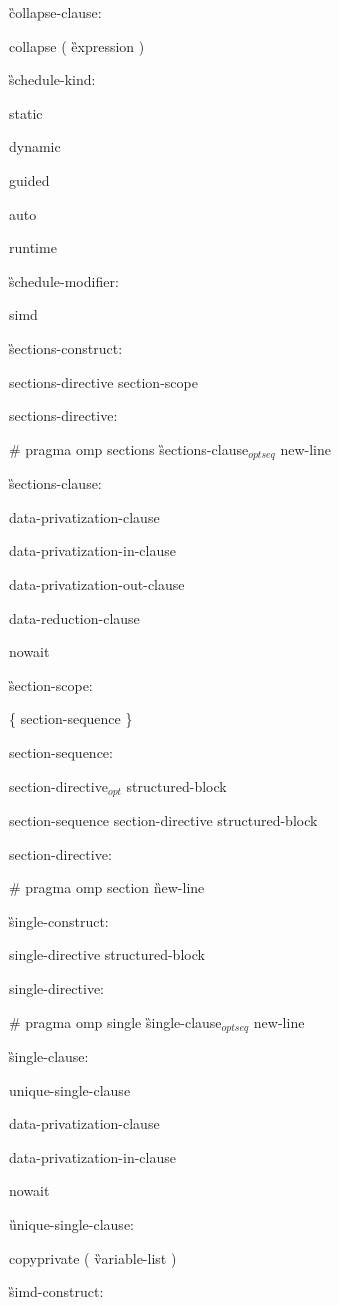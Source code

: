 {\G collapse-clause:

\C\I collapse ( \G expression \C )

\G schedule-kind:

\C\I static

\I dynamic

\I guided

\I auto

\I runtime

\G schedule-modifier:

\C\I simd

\G sections-construct:

\I sections-directive section-scope

sections-directive:

\C\I \# pragma omp sections \G sections-clause$_{optseq}$ new-line

\G sections-clause:

\I data-privatization-clause 

\I data-privatization-in-clause 

\I data-privatization-out-clause 

\I data-reduction-clause 

\C\I nowait

\G section-scope:

\I \{ section-sequence \}

section-sequence:

\I section-directive$_{opt}$ structured-block

\I section-sequence section-directive structured-block

section-directive:

\C\I \# pragma omp section \G new-line

\G single-construct:

\I single-directive structured-block

single-directive:

\C\I \# pragma omp single \G single-clause$_{optseq}$ new-line

\G single-clause:

\I unique-single-clause

\I data-privatization-clause

\I data-privatization-in-clause

\C\I nowait

\G unique-single-clause:

\C\I copyprivate ( \G variable-list \C )

\G simd-construct:

}
